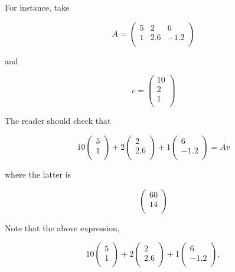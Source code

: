 \documentclass[
  letterpaper,
  DIV=11,
  numbers=noendperiod,
  oneside]{scrreprt}
\begin{document}
For instance, take

\[
A = \left (
\begin{array}{rr}
5 & 2 & 6 \\
1 & 2.6 & -1.2 \\
\end{array}
\right )
\]

and

\[
v = \left (
\begin{array}{rrr}
10 \\
2 \\
1 \\
\end{array}
\right )
\]

The reader should check that

\[
10 \left (
\begin{array}{rr}
5 \\
1 \\
\end{array}
\right )
+
2 \left (
\begin{array}{rr}
2 \\
2.6 \\
\end{array}
\right )
+
1 \left (
\begin{array}{rr}
6 \\
-1.2 \\
\end{array}
\right )
= Av
\]

where the latter is

\[
\left (
\begin{array}{rr}
60 \\
14  \\
\end{array}
\right )
\]

Note that the above expression,

\[
10 \left (
\begin{array}{rr}
5 \\
1 \\
\end{array}
\right )
+
2 \left (
\begin{array}{rr}
2 \\
2.6 \\
\end{array}
\right )
+
1 \left (
\begin{array}{rr}
6 \\
-1.2 \\
\end{array}
\right ),
\]
\end{document}
